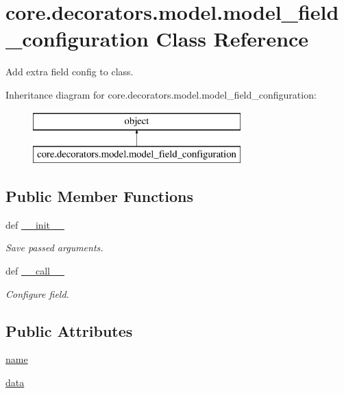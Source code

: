 \hypertarget{classcore_1_1decorators_1_1model_1_1model__field__configuration}{\section{core.\-decorators.\-model.\-model\-\_\-field\-\_\-configuration Class Reference}
\label{classcore_1_1decorators_1_1model_1_1model__field__configuration}
}


Add extra field config to class.  


Inheritance diagram for core.\-decorators.\-model.\-model\-\_\-field\-\_\-configuration\-:\begin{figure}[H]
\begin{center}
\leavevmode
\includegraphics[height=2.000000cm]{classcore_1_1decorators_1_1model_1_1model__field__configuration}
\end{center}
\end{figure}
\subsection*{Public Member Functions}
\begin{DoxyCompactItemize}
\item 
def \hyperlink{classcore_1_1decorators_1_1model_1_1model__field__configuration_a230303617598b55606e239973dea6e84}{\-\_\-\-\_\-init\-\_\-\-\_\-}
\begin{DoxyCompactList}\small\item\em Save passed arguments. \end{DoxyCompactList}\item 
def \hyperlink{classcore_1_1decorators_1_1model_1_1model__field__configuration_afd077e96a289de0cd9fb2e350a80fee2}{\-\_\-\-\_\-call\-\_\-\-\_\-}
\begin{DoxyCompactList}\small\item\em Configure field. \end{DoxyCompactList}\end{DoxyCompactItemize}
\subsection*{Public Attributes}
\begin{DoxyCompactItemize}
\item 
\hyperlink{classcore_1_1decorators_1_1model_1_1model__field__configuration_aa400bdb842117e4d6e8b4bfcbbd20603}{name}
\item 
\hyperlink{classcore_1_1decorators_1_1model_1_1model__field__configuration_ae2ed0506f2a3f467dbc5791e61e5a459}{data}
\end{DoxyCompactItemize}


